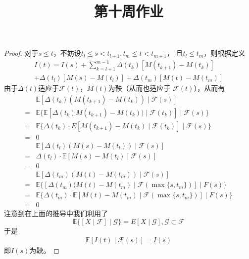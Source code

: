 \documentclass[cn]{homework}
\title{第十周作业}
\newcommand{\E}{\mathbb E}
\begin{document}
    \maketitle

    \problem[习题4.1]
    \begin{proof}
        对于$s\leq t$，不妨设$t_l\leq s<t_{l+1},t_m\leq t<t_{m+1}$，
        且$t_l\leq t_m$，则根据定义
        \begin{multline*}
            I(t)=I(s)+\sum_{k=l+1}^{m-1}\Delta(t_k)[M(t_{k+1})-M(t_k)]\\
            +\Delta(t_l)[M(s)-M(t_l)]+\Delta(t_m)[M(t)-M(t_m)]
        \end{multline*}
        由于$\Delta(t)$适应于$\mathcal F(t)$，$M(t)$为鞅（从而也适应于
        $\mathcal F(t)$），从而有
        \[\begin{aligned}
            &\E[\Delta(t_k)(M(t_{k+1})-M(t_k))\mid\mathcal F(s)]\\
            =&\E\{\E[\Delta(t_k)M(t_{k+1})-M(t_k))\mid\mathcal F(t_k)]\mid \mathcal F(s)\}\\
            =&\E\{\Delta(t_k)\cdot E[M(t_{k+1})-M(t_k)\mid\mathcal F(t_k)]\mid\mathcal F(s)\}\\
            =&0\\
            &\E[\Delta(t_l)(M(s)-M(t_l))\mid\mathcal F(s)]\\
            =&\Delta(t_l)\cdot\E[M(s)-M(t_l)\mid\mathcal F(s)]\\
            =&0\\
            &\E[\Delta (t_m)(M(t)-M(t_m))\mid\mathcal F(s)]\\
            =&\E\{[\Delta(t_m)(M(t)-M(t_m)\mid\mathcal F(\max\{s,t_m\})]\mid F(s)\}\\
            =&\E\{\Delta(t_m)\cdot\E[M(t)-M(t_m)\mid\mathcal F(\max\{s,t_m\})]\mid F(s)\}\\
            =&0
        \end{aligned}\]
        注意到在上面的推导中我们利用了
        \[\E\{[X\mid \mathcal F]\mid\mathcal G\}=E[X\mid\mathcal G],
        \mathcal G\subset \mathcal F\]
        于是
        \[\begin{aligned}
            \E[I(t)\mid\mathcal F(s)]=I(s)
        \end{aligned}\]
        即$I(s)$为鞅。
    \end{proof}
\end{document}
